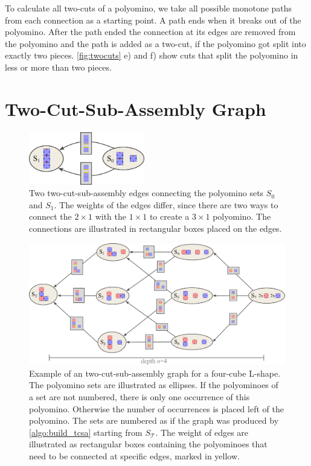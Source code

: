 To calculate all two-cuts of a polyomino, we take all possible monotone paths from each connection as a starting point.
A path ends when it breaks out of the polyomino.
After the path ended the connection at its edges are removed from the polyomino and the path is added as a two-cut, if the polyomino got split into exactly two pieces.
\autoref{fig:twocuts} e) and f) show cuts that split the polyomino in less or more than two pieces.


\section{Two-Cut-Sub-Assembly Graph}
\label{sec:tcsa}

\begin{figure}
	\centering
	\includegraphics[width=0.45\textwidth]{figures/tcsa_multiedge.pdf}
	\caption[Two two-cut-sub-assembly nodes connected with multiple edges.]{Two two-cut-sub-assembly edges connecting the polyomino sets $S_0$ and $S_1$. The weights of the edges differ, since there are two ways to connect the $2\times1$ with the $1\times1$ to create a $3\times1$ polyomino. The connections are illustrated in rectangular boxes placed on the edges.}
	\label{fig:tcsa_multiedge}
\end{figure}

\begin{figure}
	\centering
	\includegraphics[width=1\textwidth]{figures/tcsa.pdf}
	\caption[Example for a two-cut-sub-assembly graph.]{Example of an two-cut-sub-assembly graph for a four-cube L-shape. The polyomino sets are illustrated as ellipses. If the polyominoes of a set are not numbered, there is only one occurrence of this polyomino. Otherwise the number of occurrences is placed left of the polyomino. The sets are numbered as if the graph was produced by \autoref{algo:build_tcsa} starting from $S_\mathcal{T}$. The weight of edges are illustrated as rectangular boxes containing the polyominoes that need to be connected at specific edges, marked in yellow.}
	\label{fig:tcsa}
\end{figure}


